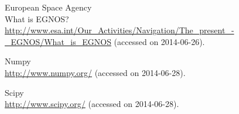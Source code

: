 \documentclass[12pt,a4paper,ngerman]{scrartcl}
\begin{document}
\begin{thebibliography}{99}
European Space Agency\\
What is EGNOS?
\url{http://www.esa.int/Our_Activities/Navigation/The_present_-_EGNOS/What_is_EGNOS} (accessed on 2014-06-26).

Numpy\\
\url{http://www.numpy.org/} (accessed on 2014-06-28).

Scipy\\
\url{http://www.scipy.org/} (accessed on 2014-06-28).

\end{thebibliography}
\end{document}
